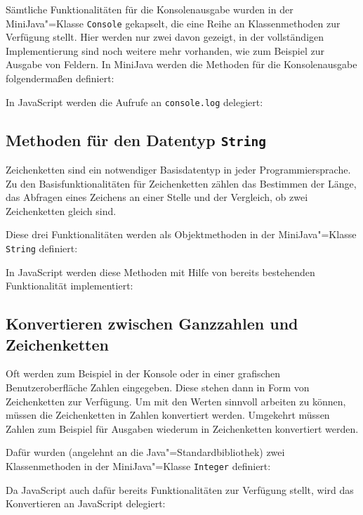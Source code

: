 Sämtliche Funktionalitäten für die Konsolenausgabe wurden in der MiniJava"=Klasse \lstinline{Console} gekapselt, die eine Reihe an Klassenmethoden zur Verfügung stellt. Hier werden nur zwei davon gezeigt, in der vollständigen Implementierung sind noch weitere mehr vorhanden, wie zum Beispiel zur Ausgabe von Feldern. In MiniJava werden die Methoden für die Konsolenausgabe folgendermaßen definiert:


In JavaScript werden die Aufrufe an \lstinline{console.log} delegiert:


\subsection{Methoden für den Datentyp \lstinline{String}}

Zeichenketten sind ein notwendiger Basisdatentyp in jeder Programmiersprache. Zu den Basisfunktionalitäten für Zeichenketten zählen das Bestimmen der Länge, das Abfragen eines Zeichens an einer Stelle und der Vergleich, ob zwei Zeichenketten gleich sind.

Diese drei Funktionalitäten werden als Objektmethoden in der MiniJava"=Klasse \lstinline{String} definiert:


In JavaScript werden diese Methoden mit Hilfe von bereits bestehenden Funktionalität implementiert:


\subsection{Konvertieren zwischen Ganzzahlen und Zeichenketten}

Oft werden zum Beispiel in der Konsole oder in einer grafischen Benutzeroberfläche Zahlen eingegeben. Diese stehen dann in Form von Zeichenketten zur Verfügung. Um mit den Werten sinnvoll arbeiten zu können, müssen die Zeichenketten in Zahlen konvertiert werden. Umgekehrt müssen Zahlen zum Beispiel für Ausgaben wiederum in Zeichenketten konvertiert werden.

Dafür wurden (angelehnt an die Java"=Standardbibliothek) zwei Klassenmethoden in der MiniJava"=Klasse \lstinline{Integer} definiert:


\pagebreak
Da JavaScript auch dafür bereits Funktionalitäten zur Verfügung stellt, wird das Konvertieren an JavaScript delegiert:



